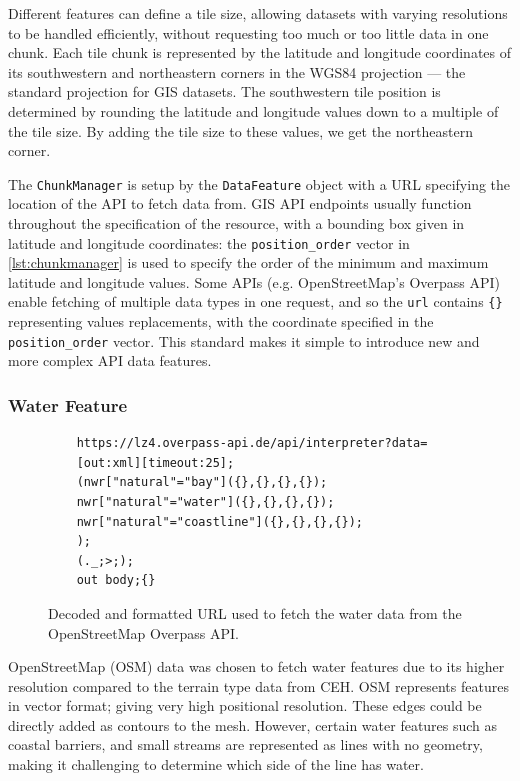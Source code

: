 \documentclass[12pt]{article}
\begin{document}
Different features can define a tile size, allowing datasets with varying resolutions to be handled efficiently, without requesting too much or too little data in one chunk. Each tile chunk is represented by the latitude and longitude coordinates of its southwestern and northeastern corners in the WGS84 projection --- the standard projection for GIS datasets. The southwestern tile position is determined by rounding the latitude and longitude values down to a multiple of the tile size. By adding the tile size to these values, we get the northeastern corner.

The \texttt{ChunkManager} is setup by the \texttt{DataFeature} object with a URL specifying the location of the API to fetch data from. GIS API endpoints usually function throughout the specification of the resource, with a bounding box given in latitude and longitude coordinates: the \texttt{position\_order} vector in \autoref{lst:chunkmanager} is used to specify the order of the minimum and maximum latitude and longitude values. Some APIs (e.g. OpenStreetMap's Overpass API) enable fetching of multiple data types in one request, and so the \texttt{url} contains \texttt{\{\}} representing values replacements, with the coordinate specified in the \texttt{position\_order} vector. This standard makes it simple to introduce new and more complex API data features.

\subsubsection{Water Feature}

\begin{figure}[H]
  \centering
  \begin{lstlisting}
	https://lz4.overpass-api.de/api/interpreter?data=
	[out:xml][timeout:25];
	(nwr["natural"="bay"]({},{},{},{});
	nwr["natural"="water"]({},{},{},{});
	nwr["natural"="coastline"]({},{},{},{});
	);
	(._;>;);
	out body;{}
	\end{lstlisting}
  \caption{Decoded and formatted URL used to fetch the water data from the OpenStreetMap Overpass API.}
  \label{url:water}
\end{figure}

OpenStreetMap (OSM) data was chosen to fetch water features due to its higher resolution compared to the terrain type data from CEH. OSM represents features in vector format; giving very high positional resolution. These edges could be directly added as contours to the mesh. However, certain water features such as coastal barriers, and small streams are represented as lines with no geometry, making it challenging to determine which side of the line has water.
\end{document}
